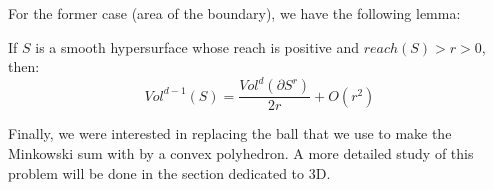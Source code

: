For the former case (area of the boundary), we have the following lemma:
\begin{lemma}
    If $ S $ is a smooth hypersurface whose reach is positive and $ reach(S) > r
    > 0 $, then: $$ Vol^{d-1}(S) = \frac{Vol^d(\partial S^r)}{2r} + O(r^2) $$
\end{lemma}

Finally, we were interested in replacing the ball that we use to make the
Minkowski sum with by a convex polyhedron. A more detailed study of this problem
will be done in the section dedicated to 3D.






